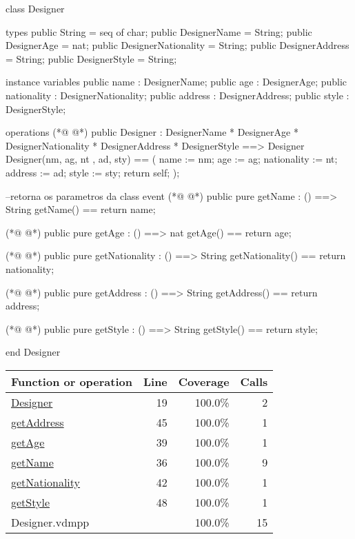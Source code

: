 \begin{vdmpp}[breaklines=true]
class Designer

types
 public String = seq of char;
 public DesignerName = String;
 public DesignerAge = nat;
 public DesignerNationality = String;
 public DesignerAddress = String;
 public DesignerStyle = String;
 
instance variables
 public name : DesignerName;
 public age : DesignerAge;
 public nationality : DesignerNationality;
 public address : DesignerAddress;
 public style : DesignerStyle;
 
 operations
(*@
\label{Designer:19}
@*)
  public Designer : 
          DesignerName * 
          DesignerAge *
          DesignerNationality * 
          DesignerAddress * 
          DesignerStyle   ==> Designer
  Designer(nm, ag, nt , ad, sty) ==
  (
    name := nm;
    age := ag;
    nationality := nt;
    address := ad;
    style := sty;
    return self;
  );
  
  --retorna os parametros da class event
(*@
\label{getName:36}
@*)
  public pure getName : () ==> String
    getName() == return name;
    
(*@
\label{getAge:39}
@*)
   public pure getAge : () ==> nat
     getAge() == return age;
     
(*@
\label{getNationality:42}
@*)
  public pure getNationality : () ==> String
     getNationality() == return nationality;
     
(*@
\label{getAddress:45}
@*)
  public pure getAddress : () ==> String
     getAddress() == return address;      
     
(*@
\label{getStyle:48}
@*)
  public pure getStyle : () ==> String
     getStyle() == return style;
     
end Designer
\end{vdmpp}
\bigskip
\begin{longtable}{|l|r|r|r|}
\hline
Function or operation & Line & Coverage & Calls \\
\hline
\hline
\hyperref[Designer:19]{Designer} & 19&100.0\% & 2 \\
\hline
\hyperref[getAddress:45]{getAddress} & 45&100.0\% & 1 \\
\hline
\hyperref[getAge:39]{getAge} & 39&100.0\% & 1 \\
\hline
\hyperref[getName:36]{getName} & 36&100.0\% & 9 \\
\hline
\hyperref[getNationality:42]{getNationality} & 42&100.0\% & 1 \\
\hline
\hyperref[getStyle:48]{getStyle} & 48&100.0\% & 1 \\
\hline
\hline
Designer.vdmpp & & 100.0\% & 15 \\
\hline
\end{longtable}


